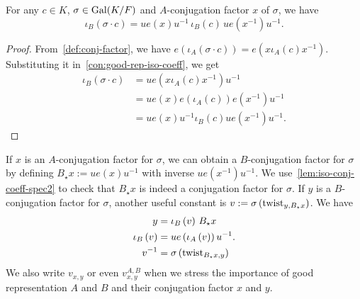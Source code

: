 \begin{lemma}\label{lem:iso-conj-coeff-spec2}
  For any $c \in K$, $\sigma\in\operatorname{Gal}(K/F)$ and $A$-conjugation factor $x$ of $\sigma$, we have
  \[
    \iota_{B}\left(\sigma\cdot c\right) = ue(x)u^{-1}\,\iota_{B}(c)\,ue\left(x^{-1}\right)u^{-1}.
  \]
  \leanok
\end{lemma}
\begin{proof}
  From~\cref{def:conj-factor}, we have $e\left(\iota_{A}(\sigma \cdot c)\right) = e\left(x\iota_{A}(c)x^{-1}\right)$. Substituting it in~\cref{con:good-rep-iso-coeff}, we get
  \[
    \begin{aligned}
      \iota_{B}(\sigma \cdot c) &= ue\left(x\iota_{A}(c)x^{-1}\right)u^{-1}\\
                                &= ue(x)e\left(\iota_{A}(c)\right)e\left(x^{-1}\right)u^{-1}\\
      &= ue(x)u^{-1}\iota_{B}(c)ue\left(x^{-1}\right)u^{-1}.
    \end{aligned}
  \]
\end{proof}

\begin{construction}
  \label{con:push-forward-conj-factor}
  If $x$ is an $A$-conjugation factor for $\sigma$, we can obtain a $B$-conjugation factor for $\sigma$ by defining $B_{\star}x := ue(x)u^{-1}$ with inverse $ue\left(x^{-1}\right)u^{-1}$. We use~\cref{lem:iso-conj-coeff-spec2} to check that $B_{\star}x$ is indeed a conjugation factor for $\sigma$. If $y$ is a $B$-conjugation factor for $\sigma$, another useful constant is $v := \sigma\left(\operatorname{twist}_{y, B_{\star}x}\right)$. We have
  \[
    \begin{aligned}
    y &= \iota_{B}\left(v\right)\, B_{\star}x \\
      \iota_{B}\left(v\right) &= u e\left(\iota_{A}\left(v\right)\right)u^{-1}\\
      v^{-1} &= \sigma\left(\operatorname{twist}_{B_{\star}x, y}\right)
    \end{aligned}.
  \]
  We also write $v_{x,y}$ or even $v^{A,B}_{x, y}$ when we stress the importance of good representation $A$ and $B$ and their conjugation factor $x$ and $y$.
\end{construction}

